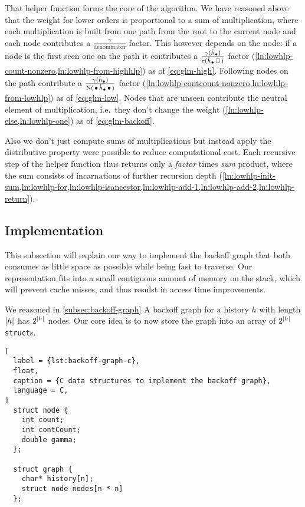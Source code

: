 That helper function  forms the core of the algorithm.
We have reasoned above that the weight for lower orders is proportional to
a sum of multiplication, where each multiplication is built from one path
from the root to the current node and each node contributes a
$\frac{\gamma}{\text{denominator}}$ factor.
This however depends on the node: if a node is the first seen one on the path
it contributes a
$\frac{\gamma(\DerivedHistory[\DummyIndex])}{\Count(\DerivedHistory[\DummyIndex] \Skp)}$
factor (\cref{ln:lowhlp-count-nonzero,ln:lowhlp-from-highhlp}) as of
\cref{eq:glm-high}. Following nodes on the path contribute a
$\frac{\gamma(\DerivedHistory[\DummyIndex])}{\ContCount(\WSkp \DerivedHistory[\DummyIndex] \WSkp)}$
factor (\cref{ln:lowhlp-contcount-nonzero,ln:lowhlp-from-lowhlp}) as of
\cref{eq:glm-low}.
Nodes that are unseen contribute the neutral element of multiplication, i.e.\
they don't change the weight (\cref{ln:lowhlp-else,ln:lowhlp-one}) as of
\cref{eq:glm-backoff}.

Also we don't just compute sums of multiplications but instead apply
the distributive property were possible to reduce computational cost.
Each recursive step of the helper function thus returns only a \emph{factor}
times \emph{sum} product, where the sum consists of incarnations of further
recursion depth
(\cref{ln:lowhlp-init-sum,ln:lowhlp-for,ln:lowhlp-isancestor,ln:lowhlp-add-1,ln:lowhlp-add-2,ln:lowhlp-return}).

\subsection{Implementation}
\label{subsec:weightedsum-glm-implementation}

This subsection will explain our way to implement the backoff graph that both
consumes as little space as possible while being fast to traverse.
Our representation fits into a small contiguous amount of memory on the stack,
which will prevent cache misses, and thus resulst in access time improvements.

We reasoned in \cref{subsec:backoff-graph} A backoff graph for a history $h$
with length ${\left|h\right|}$ has $2^{\left|h\right|}$ nodes.
Our core idea is to now store the graph into an array of $2^{\left|h\right|}$
\texttt{struct}s.

\begin{lstlisting}[
  label = {lst:backoff-graph-c},
  float,
  caption = {C data structures to implement the backoff graph},
  language = C,
]
  struct node {
    int count;
    int contCount;
    double gamma;
  };

  struct graph {
    char* history[n];
    struct node nodes[n * n]
  };
\end{lstlisting}

